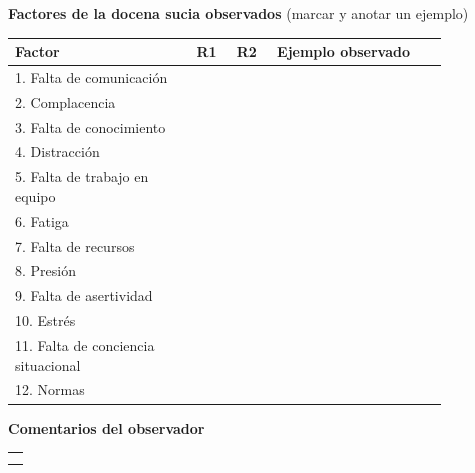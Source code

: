 \vspace{8pt}
\noindent\textbf{Factores de la docena sucia observados} (marcar y anotar un ejemplo)\\[2pt]
\begin{tabular}{|p{0.36\linewidth}|>{\centering\arraybackslash}p{0.08\linewidth}|>{\centering\arraybackslash}p{0.08\linewidth}|p{0.34\linewidth}|}
\hline
\textbf{Factor} & \textbf{R1} & \textbf{R2} & \textbf{Ejemplo observado} \\ \hline
1. Falta de comunicación & & & \\ \hline
2. Complacencia & & & \\ \hline
3. Falta de conocimiento & & & \\ \hline
4. Distracción & & & \\ \hline
5. Falta de trabajo en equipo & & & \\ \hline
6. Fatiga & & & \\ \hline
7. Falta de recursos & & & \\ \hline
8. Presión & & & \\ \hline
9. Falta de asertividad & & & \\ \hline
10. Estrés & & & \\ \hline
11. Falta de conciencia situacional & & & \\ \hline
12. Normas & & & \\ \hline
\end{tabular}

\vspace{8pt}
\noindent\textbf{Comentarios del observador}\\[2pt]
\begin{tabular}{|p{0.955\linewidth}|}
\hline
\\ \hline
\\ \hline
\\ \hline
\end{tabular}
\renewcommand{\arraystretch}{1.15}
